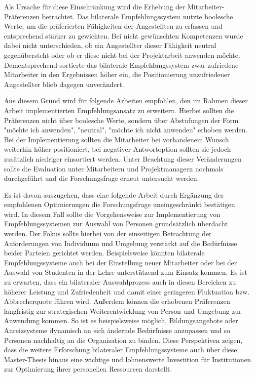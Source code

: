 Als Ursache für diese Einschränkung wird die Erhebung der Mitarbeiter-Präferenzen betrachtet. Das bilaterale Empfehlungssystem nutzte boolesche Werte, um die präferierten Fähigkeiten der Angestellten zu erfassen und entsprechend stärker zu gewichten. Bei nicht gewünschten Kompetenzen wurde dabei nicht unterschieden, ob ein Angestellter dieser Fähigkeit neutral gegenübersteht oder ob er diese nicht bei der Projektarbeit anwenden möchte. Dementsprechend sortierte das bilaterale Empfehlungssystem zwar zufriedene Mitarbeiter in den Ergebnissen höher ein, die Positionierung unzufriedener Angestellter blieb dagegen unverändert.

Aus diesem Grund wird für folgende Arbeiten empfohlen, den im Rahmen dieser Arbeit implementierten Empfehlungsansatz zu erweitern. Hierbei sollten die Präferenzen nicht über boolesche Werte, sondern über Abstufungen der Form "möchte ich anwenden", "neutral", "möchte ich nicht anwenden" erhoben werden. Bei der Implementierung sollten die Mitarbeiter bei vorhandenem Wunsch weiterhin höher positioniert, bei negativer Antwortoption sollten sie jedoch zusätzlich niedriger einsortiert werden. Unter Beachtung dieser Veränderungen sollte die Evaluation unter Mitarbeitern und Projektmanagern nochmals durchgeführt und die Forschungsfrage erneut untersucht werden.

Es ist davon auszugehen, dass eine folgende Arbeit durch Ergänzung der empfohlenen Optimierungen die Forschungsfrage uneingeschränkt bestätigen wird. In diesem Fall sollte die Vorgehensweise zur Implementierung von Empfehlungssystemen zur Auswahl von Personen grundsätzlich überdacht werden. Der Fokus sollte hierbei von der einseitigen Betrachtung der Anforderungen von Individuum und Umgebung verstärkt auf die Bedürfnisse beider Parteien gerichtet werden. Beispielsweise könnten bilaterale Empfehlungssysteme auch bei der Einstellung neuer Mitarbeiter oder bei der Auswahl von Studenten in der Lehre unterstützend zum Einsatz kommen. Es ist zu erwarten, dass ein bilateraler Auswahlprozess auch in diesen Bereichen zu höherer Leistung und Zufriedenheit und damit einer geringeren Fluktuation bzw. Abbrecherquote führen wird. Außerdem können die erhobenen Präferenzen langfristig zur strategischen Weiterentwicklung von Person und Umgebung zur Anwendung kommen. So ist es beispielsweise möglich, Bildungsangebote oder Anreizsysteme dynamisch an sich ändernde Bedürfnisse anzupassen und so Personen nachhaltig an die Organisation zu binden. Diese Perspektiven zeigen, dass die weitere Erforschung bilateraler Empfehlungssysteme auch über diese Master-Thesis hinaus eine wichtige und lohnenswerte Investition für Institutionen zur Optimierung ihrer personellen Ressourcen darstellt.
